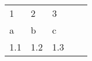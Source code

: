 \begin{table}[htbp]
\begin{tabular}{lllll}
1 & 2 & 3 \\
a & b & c \\
1.1 & 1.2 & 1.3
\end{tabular}
\end{table}
    